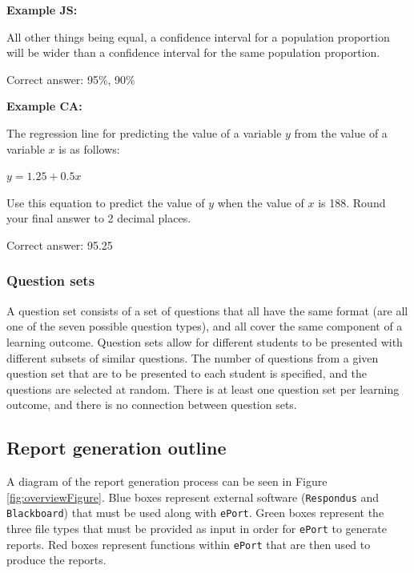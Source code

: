 \documentclass{article}\usepackage[]{graphicx}\usepackage[]{color}
\numberwithin{equation}{section} %
\begin{document}
\begin{framed}
\textbf{Example JS:}

All other things being equal, a \underline{\hspace{2cm}} confidence interval for a population proportion will be wider than a \underline{\hspace{2cm}} confidence interval for the same population proportion.

Correct answer: 95\%, 90\%
\end{framed}

\begin{framed}
\textbf{Example CA:}

The regression line for predicting the value of a variable $y$ from the value of a variable $x$ is as follows:

$y = 1.25 + 0.5x$

Use this equation to predict the value of $y$ when the value of $x$ is 188. Round your final answer to 2 decimal places.

Correct answer: 95.25
\end{framed}

\subsubsection{Question sets}

A question set consists of a set of questions that all have the same format (are all one of the seven possible question types), and all cover the same component of a learning outcome. Question sets allow for different students to be presented with different subsets of similar questions. The number of questions from a given question set that are to be presented to each student is specified, and the questions are selected at random. There is at least one question set per learning outcome, and there is no connection between question sets.

\subsection{Report generation outline}

A diagram of the report generation process can be seen in Figure \ref{fig:overviewFigure}. Blue boxes represent external software (\texttt{Respondus} and \texttt{Blackboard}) that must be used along with \texttt{ePort}. Green boxes represent the three file types that must be provided as input in order for \texttt{ePort} to generate reports. Red boxes represent functions within \texttt{ePort} that are then used to produce the reports.
\end{document}
